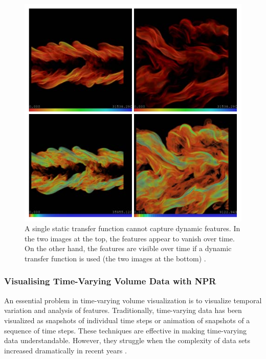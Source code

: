 \begin{figure}
\centering
\includegraphics[width=1\linewidth]{images/woodring_semi-automatic_2009}
\caption{A single static transfer function cannot capture dynamic features. In the two images at the top, the features appear to vanish over time. On the other hand, the features are visible over time if a dynamic transfer function is used (the two images at the bottom) \cite{woodring_semi-automatic_2009}.}
\label{fig:woodring_semi-automatic_2009}
\end{figure}

\subsubsection{Visualising Time-Varying Volume Data with NPR}
An essential problem in time-varying volume visualization is to visualize temporal variation and analysis of features. Traditionally, time-varying data has been visualized as snapshots of individual time steps or animation of snapshots of a sequence of time steps. These techniques are effective in making time-varying data understandable. However, they struggle when the complexity of data sets increased dramatically in recent years \cite{brambilla_illustrative_2012}.

